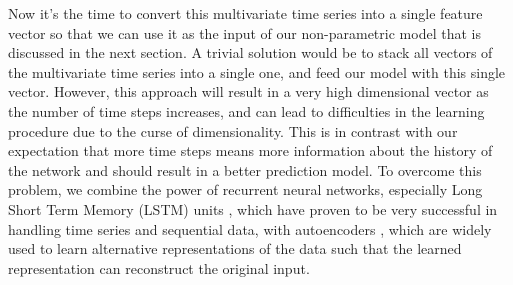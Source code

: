 Now it's the time to convert this multivariate time series into a single feature vector so that we can use it as the input of our non-parametric model that is discussed in the next section. A trivial solution would be to stack all vectors of the multivariate time series into a single one, and feed our model with this single vector. However, this approach will result in a very high dimensional vector as the number of time steps increases, and can lead to difficulties in the learning procedure due to the curse of dimensionality. This is in contrast with our expectation that more time steps means more information about the history of the network and should result in a better prediction model. To overcome this problem, we combine the power of recurrent neural networks, especially Long Short Term Memory (LSTM) units \cite{hochreiter1997long}, which have proven to be very successful in handling time series and sequential data, with autoencoders \cite{bengio2009learning}, which are widely used to learn alternative representations of the data such that the learned representation can reconstruct the original input.

